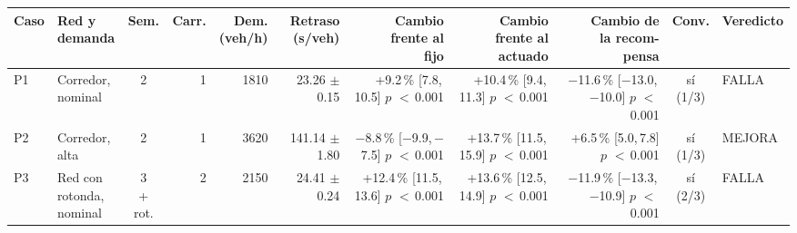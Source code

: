 \begin{table}[H]
\centering
\scriptsize
\setlength{\tabcolsep}{1.5pt}
\begin{tabular}{llcrrrrrrcl}
\toprule
Caso & \makecell[l]{Red y\\demanda} & Sem. & Carr. & \makecell{Dem.\\(veh/h)} & \makecell{Retraso\\(s/veh)} & \makecell{Cambio\\frente al\\fijo} & \makecell{Cambio\\frente al\\actuado} & \makecell{Cambio de\\la recom-\\pensa} & Conv. & Veredicto \\
\midrule
P1 & \makecell[l]{Corredor,\\{}nominal} & 2 & 1 & 1810 & \makecell[r]{23.26\\{}$\pm$ 0.15} & \makecell[r]{+9.2\,\%\\{}[7.8,\,10.5]\\$p$ $<$\,0.001} & \makecell[r]{+10.4\,\%\\{}[9.4,\,11.3]\\$p$ $<$\,0.001} & \makecell[r]{$-$11.6\,\%\\{}[$-$13.0,\,$-$10.0]\\$p$ $<$\,0.001} & \makecell[c]{sí\\{}(1/3)} & FALLA \\
P2 & \makecell[l]{Corredor,\\{}alta} & 2 & 1 & 3620 & \makecell[r]{141.14\\{}$\pm$ 1.80} & \makecell[r]{$-$8.8\,\%\\{}[$-$9.9,\,$-$7.5]\\$p$ $<$\,0.001} & \makecell[r]{+13.7\,\%\\{}[11.5,\,15.9]\\$p$ $<$\,0.001} & \makecell[r]{+6.5\,\%\\{}[5.0,\,7.8]\\$p$ $<$\,0.001} & \makecell[c]{sí\\{}(1/3)} & MEJORA \\
P3 & \makecell[l]{Red con\\{}rotonda,\\{}nominal} & \makecell[c]{3\\{}+ rot.} & 2 & 2150 & \makecell[r]{24.41\\{}$\pm$ 0.24} & \makecell[r]{+12.4\,\%\\{}[11.5,\,13.6]\\$p$ $<$\,0.001} & \makecell[r]{+13.6\,\%\\{}[12.5,\,14.9]\\$p$ $<$\,0.001} & \makecell[r]{$-$11.9\,\%\\{}[$-$13.3,\,$-$10.9]\\$p$ $<$\,0.001} & \makecell[c]{sí\\{}(2/3)} & FALLA \\

\end{tabular}
\end{table}

